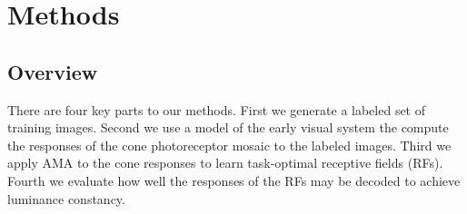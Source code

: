 \documentclass{jov}
\begin{document}

\section*{Methods} \label{Methods}
\subsection{Overview}
There are four key parts to our methods.  First we generate a labeled set of training images.  Second we use a model of the early visual system the compute the responses of the cone photoreceptor mosaic to the labeled images. Third we apply AMA to the cone responses to learn task-optimal receptive fields (RFs). Fourth we evaluate how well the responses of the RFs may be decoded to achieve luminance constancy.
\end{document}
